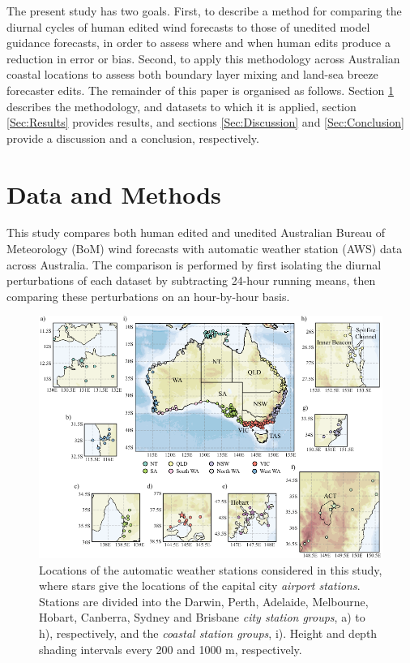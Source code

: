 \documentclass[twocol]{ametsoc}
\begin{document}
The present study has two goals. First, to describe a method for comparing the diurnal cycles of human edited wind forecasts to those of unedited model guidance forecasts, in order to assess where and when human edits produce a reduction in error or bias. Second, to apply this methodology across Australian coastal locations to assess both boundary layer mixing and land-sea breeze forecaster edits. The remainder of this paper is organised as follows. Section \ref{Sec:Methods} describes the methodology, and datasets to which it is applied, section \ref{Sec:Results} provides results, and sections \ref{Sec:Discussion} and \ref{Sec:Conclusion} provide a discussion and a conclusion, respectively.

\section{Data and Methods} \label{Sec:Methods}
This study compares both human edited and unedited Australian Bureau of Meteorology (BoM) wind forecasts with automatic weather station (AWS) data across Australia. The comparison is performed by first isolating the diurnal perturbations of each dataset by subtracting 24-hour running means, then comparing these perturbations on an hour-by-hour basis.

\begin{figure}
\centering
\includegraphics[width=39pc]{map.pdf}
\caption{Locations of the automatic weather stations considered in this study, where stars give the locations of the capital city \textit{airport stations}. Stations are divided into the Darwin, Perth, Adelaide, Melbourne, Hobart, Canberra, Sydney and Brisbane \textit{city station groups}, a) to h), respectively, and the \textit{coastal station groups}, i).  Height and depth shading intervals every 200 and 1000 m, respectively.}
\label{Fig:map}
\end{figure}
\end{document}
